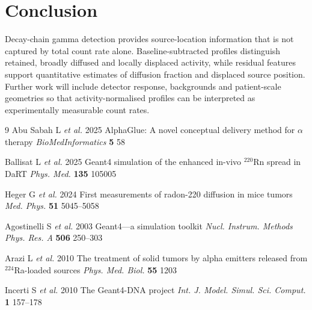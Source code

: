 \documentclass{iopconfser}
\begin{document}
\section{Conclusion}

Decay-chain gamma detection provides source-location information that is not
captured by total count rate alone. Baseline-subtracted profiles distinguish
retained, broadly diffused and locally displaced activity, while residual
features support quantitative estimates of diffusion fraction and displaced
source position. Further work will include detector response, backgrounds and
patient-scale geometries so that activity-normalised profiles can be
interpreted as experimentally measurable count rates.

\begin{thebibliography}{9}
Abu Sabah L \textit{et al.} 2025 AlphaGlue: A novel conceptual delivery method
for $\alpha$ therapy \textit{BioMedInformatics} \textbf{5} 58

Ballisat L \textit{et al.} 2025 Geant4 simulation of the enhanced in-vivo
$^{220}$Rn spread in DaRT \textit{Phys. Med.} \textbf{135} 105005

Heger G \textit{et al.} 2024 First measurements of radon-220 diffusion in mice
tumors \textit{Med. Phys.} \textbf{51} 5045--5058

Agostinelli S \textit{et al.} 2003 Geant4---a simulation toolkit
\textit{Nucl. Instrum. Methods Phys. Res. A} \textbf{506} 250--303

Arazi L \textit{et al.} 2010 The treatment of solid tumors by alpha emitters
released from $^{224}$Ra-loaded sources \textit{Phys. Med. Biol.} \textbf{55}
1203

Incerti S \textit{et al.} 2010 The Geant4-DNA project
\textit{Int. J. Model. Simul. Sci. Comput.} \textbf{1} 157--178
\end{thebibliography}
\end{document}

